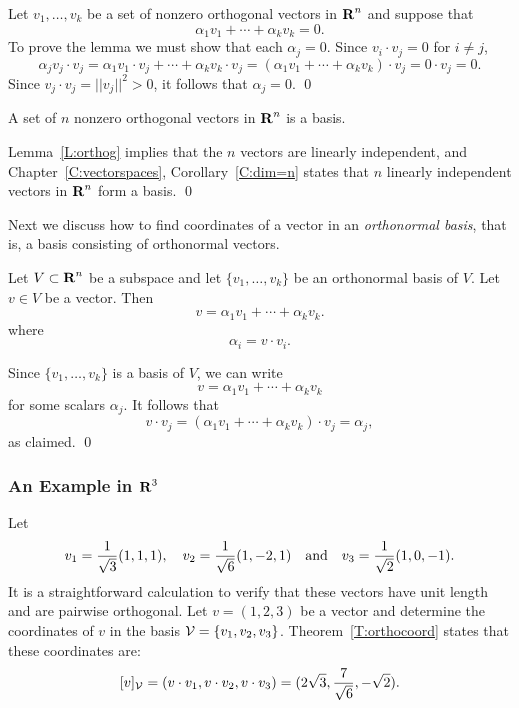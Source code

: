 \proof  Let $v_1,\ldots,v_k$ be a set of nonzero orthogonal vectors in $\mbox{$\bf{R}$}^n$
and suppose that
\[
\alpha_1v_1 + \cdots + \alpha_kv_k = 0.
\]
To prove the lemma we must show that each $\alpha_j=0$.  Since
$v_i\cdot v_j = 0$ for $i\not= j$,
\[
\alpha_jv_j\cdot v_j = \alpha_1v_1\cdot v_j + \cdots + \alpha_kv_k\cdot v_j =
(\alpha_1v_1 + \cdots +\alpha_kv_k)\cdot v_j = 0\cdot v_j = 0.
\]
Since $v_j\cdot v_j = ||v_j||^2> 0$, it follows that $\alpha_j=0$.  \qed

\begin{cor}
A set of $n$ nonzero orthogonal vectors in $\mbox{$\bf{R}$}^n$ is a basis.
\end{cor}

\proof  Lemma~\ref{L:orthog} implies that the $n$ vectors are linearly
independent, and Chapter~\ref{C:vectorspaces}, Corollary~\ref{C:dim=n} states
that $n$ linearly independent vectors in $\mbox{$\bf{R}$}^n$ form a basis.  \qed

Next we discuss how to find coordinates of a vector in an
{\em orthonormal basis},
that is, a basis consisting of orthonormal vectors.

\begin{thm}  \label{T:orthocoord}
Let $V\subset\mbox{$\bf{R}$}^n$ be a subspace and
let $\{v_1,\ldots,v_k\}$ be an
orthonormal basis of $V$.  Let $v\in V$ be a vector.   Then
\[
v = \alpha_1v_1 + \cdots + \alpha_kv_k.
\]
where
\[
\alpha_i = v\cdot v_i.
\]
\end{thm}

\proof  Since $\{v_1,\ldots,v_k\}$ is a basis of $V$, we can write
\[
v = \alpha_1v_1 + \cdots + \alpha_kv_k
\]
for some scalars $\alpha_j$.  It follows that
\[
v\cdot v_j = (\alpha_1v_1 + \cdots + \alpha_kv_k)\cdot v_j = \alpha_j,
\]
as claimed.   \qed

\subsubsection{An Example in $\mbox{$\bf{R}$}^3$}

Let
\[
v_1 = \frac{1}{\sqrt{3}}(1,1,1), \quad v_2 = \frac{1}{\sqrt{6}}(1,-2,1)
\quad\mbox{and}\quad v_3 = \frac{1}{\sqrt{2}}(1,0,-1).
\]
It is a straightforward calculation to verify that these vectors have
unit length and are pairwise orthogonal.  Let $v=(1,2,3)$ be a vector
and determine the coordinates of $v$ in the basis ${\cal V}=\{v_1,v_2,v_3\}$.
Theorem~\ref{T:orthocoord} states that these coordinates are:
\[
[v]_{\cal V} = (v\cdot v_1, v\cdot v_2, v\cdot v_3)
= (2\sqrt{3},\frac{7}{\sqrt{6}},-\sqrt{2}).
\]


